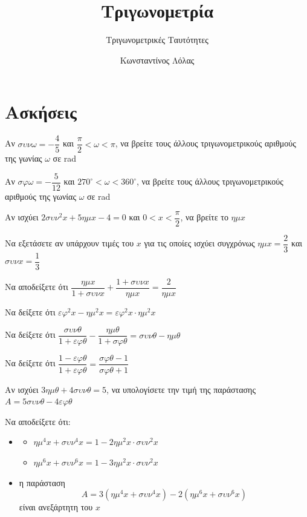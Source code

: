 \documentclass{presentation}
\title{Τριγωνομετρία}
\subtitle{Τριγωνομετρικές Ταυτότητες}
\author[Λόλας]{Κωνσταντίνος Λόλας}
\date{}
\begin{document}
\begin{frame}
  \titlepage
\end{frame}

\section{Ασκήσεις}

\begin{askisi}
  Αν $συνω=-\dfrac{4}{5}$ και $\dfrac{π}{2}<ω<π$, να βρείτε τους άλλους τριγωνομετρικούς αριθμούς της γωνίας $ω$ σε rad
\end{askisi}

\begin{askisi}
  Αν $σφω=-\dfrac{5}{12}$ και $270^{\circ}<ω<360^{\circ}$, να βρείτε τους άλλους τριγωνομετρικούς αριθμούς της γωνίας $ω$ σε rad
\end{askisi}

\begin{askisi}
  Αν ισχύει $2συν^2x+5ημx-4=0$ και $0<x<\dfrac{π}{2}$, να βρείτε το $ημx$
\end{askisi}

\begin{askisi}
  Να εξετάσετε αν υπάρχουν τιμές του $x$ για τις οποίες ισχύει συγχρόνως $ημx=\dfrac{2}{3}$ και $συνx=\dfrac{1}{3}$
\end{askisi}

\begin{askisi}
  Να αποδείξετε ότι $\dfrac{ημx}{1+συνx}+\dfrac{1+συνx}{ημx}=\dfrac{2}{ημx}$
\end{askisi}

\begin{askisi}
  Να δείξετε ότι $εφ^2x-ημ^2x=εφ^2x\cdot ημ^2x$
\end{askisi}

\begin{askisi}
  Να δείξετε ότι $\dfrac{συνθ}{1+εφθ}-\dfrac{ημθ}{1+σφθ}=συνθ-ημθ$
\end{askisi}

\begin{askisi}
  Να δείξετε ότι $\dfrac{1-εφθ}{1+εφθ}=\dfrac{σφθ-1}{σφθ+1}$
\end{askisi}

\begin{askisi}
  Αν ισχύει $3ημθ+4συνθ=5$, να υπολογίσετε την τιμή της παράστασης $Α=5συνθ-4εφθ$
\end{askisi}

\begin{askisi}
  Να αποδείξετε ότι:
  \begin{itemize}
    \item \begin{itemize}
            \item $ημ^4x+συν^4x=1-2ημ^2x\cdot συν^2x$
            \item $ημ^6x+συν^6x=1-3ημ^2x\cdot συν^2x$
          \end{itemize}
    \item η παράσταση
          $$Α=3(ημ^4x+συν^4x)-2(ημ^6x+συν^6x)$$
          είναι ανεξάρτητη του $x$
  \end{itemize}
\end{askisi}
\end{document}
